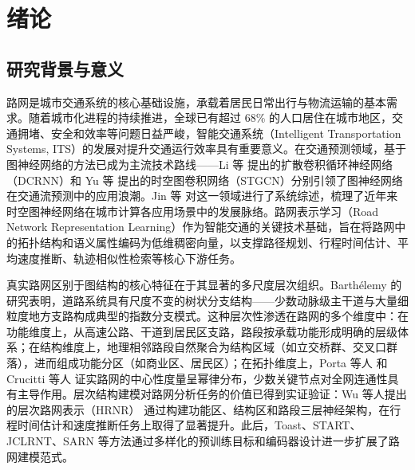 \chapter{绪\quad 论}

\section{研究背景与意义}

路网是城市交通系统的核心基础设施，承载着居民日常出行与物流运输的基本需求。随着城市化进程的持续推进，全球已有超过 68\% 的人口居住在城市地区\cite{UNDESA2018}，交通拥堵、安全和效率等问题日益严峻，智能交通系统（Intelligent Transportation Systems, ITS）的发展对提升交通运行效率具有重要意义。在交通预测领域，基于图神经网络的方法已成为主流技术路线——Li 等\cite{li2018dcrnn} 提出的扩散卷积循环神经网络（DCRNN）和 Yu 等\cite{yu2018stgcn} 提出的时空图卷积网络（STGCN）分别引领了图神经网络在交通流预测中的应用浪潮。Jin 等\cite{jin2024stgnn} 对这一领域进行了系统综述，梳理了近年来时空图神经网络在城市计算各应用场景中的发展脉络。路网表示学习（Road Network Representation Learning）作为智能交通的关键技术基础，旨在将路网中的拓扑结构和语义属性编码为低维稠密向量，以支撑路径规划\cite{wu2020hrnr}、行程时间估计\cite{chen2021toast}、平均速度推断\cite{wu2020hrnr}、轨迹相似性检索等核心下游任务。

真实路网区别于图结构的核心特征在于其显著的多尺度层次组织。Barth\'{e}lemy\cite{Barthelemy2011} 的研究表明，道路系统具有尺度不变的树状分支结构——少数动脉级主干道与大量细粒度地方支路构成典型的指数分支模式。这种层次性渗透在路网的多个维度中：在功能维度上，从高速公路、干道到居民区支路，路段按承载功能形成明确的层级体系；在结构维度上，地理相邻路段自然聚合为结构区域（如立交桥群、交叉口群落），进而组成功能分区（如商业区、居民区）；在拓扑维度上，Porta 等人\cite{PortaCrucitti2006a} 和 Crucitti 等人\cite{Crucitti2006} 证实路网的中心性度量呈幂律分布，少数关键节点对全网连通性具有主导作用。层次结构建模对路网分析任务的价值已得到实证验证：Wu 等人提出的层次路网表示（HRNR）\cite{wu2020hrnr} 通过构建功能区、结构区和路段三层神经架构，在行程时间估计和速度推断任务上取得了显著提升。此后，Toast\cite{chen2021toast}、START\cite{chen2022start}、JCLRNT\cite{mao2022jclrnt}、SARN\cite{li2023sarn} 等方法通过多样化的预训练目标和编码器设计进一步扩展了路网建模范式。

